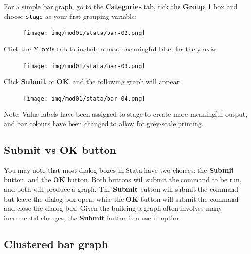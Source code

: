 \documentclass[
  a4paper,
]{memoir}
\begin{document}
For a simple bar graph, go to the \textbf{Categories} tab, tick the
\textbf{Group 1} box and choose \texttt{stage} as your first grouping
variable:

\begin{figure}[H]

{\centering \texttt{[image: img/mod01/stata/bar-02.png]}

}

\end{figure}

Click the \textbf{Y axis} tab to include a more meaningful label for the
y axis:

\begin{figure}[H]

{\centering \texttt{[image: img/mod01/stata/bar-03.png]}

}

\end{figure}

Click \textbf{Submit} or \textbf{OK}, and the following graph will
appear:

\begin{figure}[H]

{\centering \texttt{[image: img/mod01/stata/bar-04.png]}

}

\end{figure}

Note: Value labels have been assigned to stage to create more meaningful
output, and bar colours have been changed to allow for grey-scale
printing.

\hypertarget{submit-vs-ok-button}{%
\subsection{Submit vs OK button}\label{submit-vs-ok-button}}

You may note that most dialog boxes in Stata have two choices: the
\textbf{Submit} button, and the \textbf{OK} button. Both buttons will
submit the command to be run, and both will produce a graph. The
\textbf{Submit} button will submit the command but leave the dialog box
open, while the \textbf{OK} button will submit the command and close the
dialog box. Given the building a graph often involves many incremental
changes, the \textbf{Submit} button is a useful option.

\hypertarget{clustered-bar-graph}{%
\subsection{Clustered bar graph}\label{clustered-bar-graph}}
\end{document}
